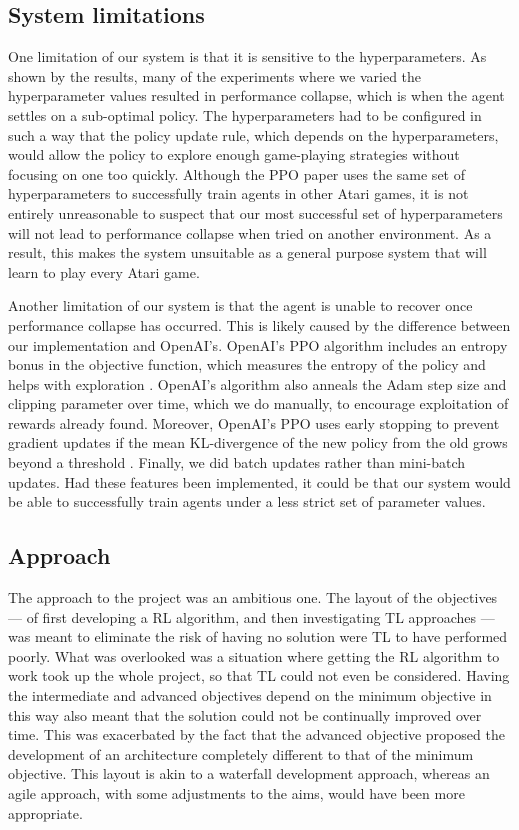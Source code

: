 \documentclass[12pt,a4paper]{article}
\begin{document}
\subsection{System limitations}
One limitation of our system is that it is sensitive to the hyperparameters. As shown by the results, many of the experiments where we varied the hyperparameter values resulted in performance collapse, which is when the agent settles on a sub-optimal policy. The hyperparameters had to be configured in such a way that the policy update rule, which depends on the hyperparameters, would allow the policy to explore enough game-playing strategies without focusing on one too quickly. Although the PPO paper uses the same set of hyperparameters to successfully train agents in other Atari games, it is not entirely unreasonable to suspect that our most successful set of hyperparameters will not lead to performance collapse when tried on another environment. As a result, this makes the system unsuitable as a general purpose system that will learn to play every Atari game. 

Another limitation of our system is that the agent is unable to recover once performance collapse has occurred. This is likely caused by the difference between our implementation and OpenAI's. OpenAI's PPO algorithm includes an entropy bonus in the objective function, which measures the entropy of the policy and helps with exploration \cite{article2}. OpenAI's algorithm also anneals the Adam step size and clipping parameter over time, which we do manually, to encourage exploitation of rewards already found. Moreover, OpenAI's PPO uses early stopping to prevent gradient updates if the mean KL-divergence of the new policy from the old grows beyond a threshold \cite{DBLP:journals/corr/SchulmanWDRK17}. Finally, we did batch updates rather than mini-batch updates. Had these features been implemented, it could be that our system would be able to successfully train agents under a less strict set of parameter values.

\subsection{Approach}
The approach to the project was an ambitious one. The layout of the objectives --- of first developing a RL algorithm, and then investigating TL approaches --- was meant to eliminate the risk of having no solution were TL to have performed poorly. What was overlooked was a situation where getting the RL algorithm to work took up the whole project, so that TL could not even be considered. Having the intermediate and advanced objectives depend on the minimum objective in this way also meant that the solution could not be continually improved over time. This was exacerbated by the fact that the advanced objective proposed the development of an architecture completely different to that of the minimum objective. This layout is akin to a waterfall development approach, whereas an agile approach, with some adjustments to the aims, would have been more appropriate. 
\end{document}
